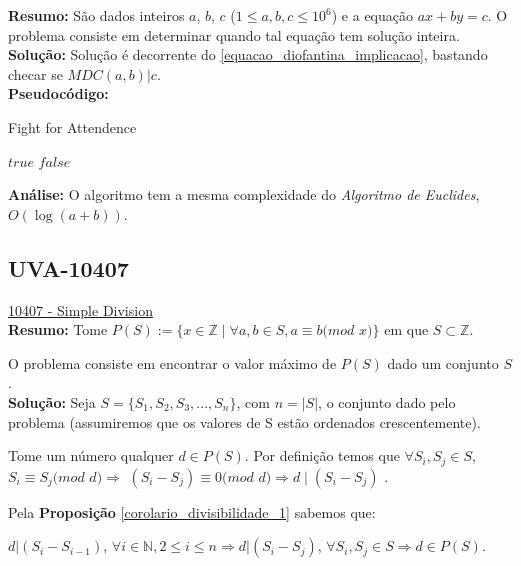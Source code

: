 \textbf{Resumo:}
São dados inteiros $a$, $b$, $c$ ($1 \leq a, b, c \leq 10^6$) e a equação $ax+by=c$. O problema consiste em determinar 
quando tal equação tem solução inteira.
\\

\textbf{Solução:}
Solução é decorrente do \autoref{equacao_diofantina_implicacao}, bastando checar se $MDC(a,b)|c$.
\\

\textbf{Pseudocódigo:}
\begin{algorithm}
\caption{Fight for Attendence}
\begin{algorithmic}[1]
\State \Return $true$
\EndIf
\State \Return $false$
\EndProcedure
\end{algorithmic}
\end{algorithm}

\textbf{Análise:}
O algoritmo tem a mesma complexidade do \textit{Algoritmo de Euclides}, $O(\log{(a+b)})$. 



\subsection{UVA-10407}
\href{https://uva.onlinejudge.org/index.php?option=onlinejudge&page=show_problem&problem=1348}{10407 - Simple Division} \\

\textbf{Resumo:} 
Tome $P(S) := \{ x \in \mathbb{Z} \mid  \forall a , b \in S , a \equiv b ( mod$ $x)\}$ em que $S \subset \mathbb{Z}$.

O problema consiste em encontrar o valor máximo de $P(S)$ dado um conjunto $S$.
\\

\textbf{Solução:} 
Seja $S = \{S_1, S_2, S_3, ..., S_n\}$, com $n = |S|$, o conjunto dado pelo problema (assumiremos que os valores de S estão ordenados crescentemente).

Tome um número qualquer $d \in P(S)$. Por definição temos que $\forall S_i, S_j \in S$, $S_i \equiv S_j ( mod$ $d) \Rightarrow $ 
$ (S_i-S_j) \equiv 0 ( mod$ $d) \Rightarrow d \mid (S_i-S_j)$ .

Pela \textbf{Proposição} \autoref{corolario_divisibilidade_1} sabemos que:

$d | (S_i-S_{i-1})$, $ \forall i \in \mathbb{N}, 2 \leq i \leq n \Rightarrow d | (S_i-S_j)$, $ \forall S_i, S_j \in S \Rightarrow d \in P(S)$.

